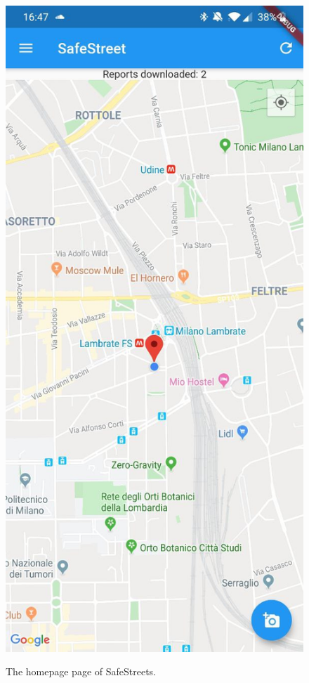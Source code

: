 \documentclass[../RASD.tex]{subfiles}
\begin{document}
    \begin{figure}[H]
        \centering
        \includegraphics[scale = 0.2]{assets/app_screenshots/home.jpg}\\
        \caption[\textit{Home Page} Screenshot]{The homepage page of SafeStreets.}
    \end{figure}
\end{document}
